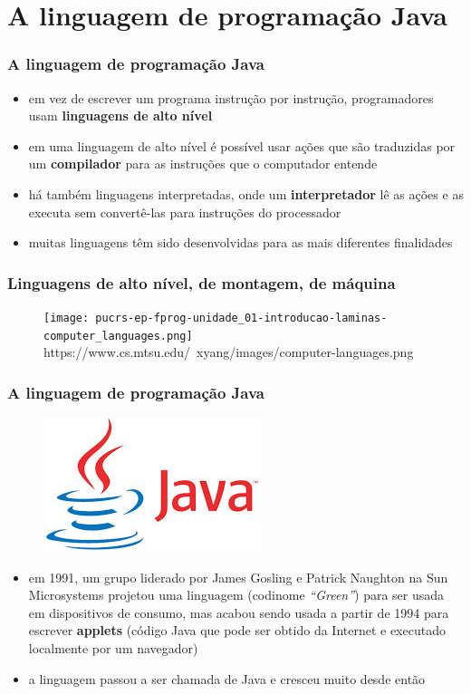 \documentclass[aspectratio=169]{beamer}
\begin{document}
\section{A linguagem de programação Java}

\begin{frame}\frametitle{A linguagem de programação Java}
\begin{itemize}
	\item em vez de escrever um programa instrução por instrução, programadores usam \textbf{linguagens de alto nível}
	\item em uma linguagem de alto nível é possível usar ações que são traduzidas por um \textbf{compilador} para as instruções que o computador entende
	\item há também linguagens interpretadas, onde um \textbf{interpretador} lê as ações e as executa sem convertê-las para instruções do processador
	\item muitas linguagens têm sido desenvolvidas para as mais diferentes finalidades
\end{itemize}
\end{frame}

\begin{frame}\frametitle{Linguagens de alto nível, de montagem, de máquina}
\begin{figure}[h]
	\centering
	\texttt{[image: pucrs-ep-fprog-unidade\_01-introducao-laminas-computer\_languages.png]}\\
	\tiny{https://www.cs.mtsu.edu/~xyang/images/computer-languages.png}
\end{figure}
\end{frame}
	
\begin{frame}\frametitle{A linguagem de programação Java}
\begin{figure}[h]
	\centering
	\includegraphics[height=0.2\paperheight]{pucrs-ep-fprog-unidade_01-introducao-laminas-java.jpg}
\end{figure}
\begin{itemize}
	\item em 1991, um grupo liderado por James Gosling e Patrick Naughton na Sun Microsystems projetou uma linguagem (codinome \emph{``Green''}) para ser usada em dispositivos de consumo, mas acabou sendo usada a partir de 1994 para escrever \textbf{applets} (código Java que pode ser obtido da Internet e executado localmente por um navegador)
	\item a linguagem passou a ser chamada de Java e cresceu muito desde então
\end{itemize}
\end{frame}
\end{document}
